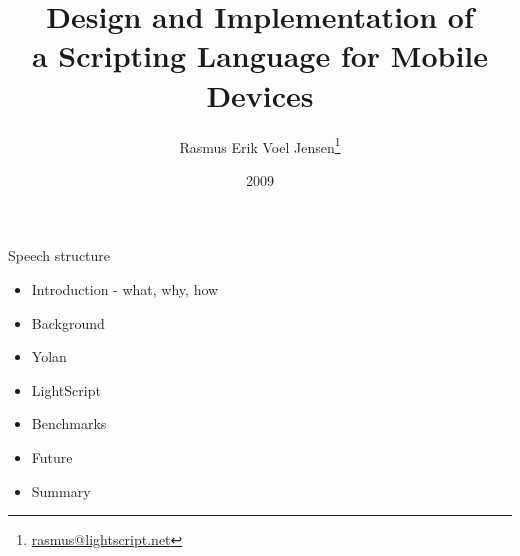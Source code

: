 \documentclass[a4paper,landscape]{slides}
\title{Design and Implementation of \\ a Scripting Language for Mobile Devices }
\author{Rasmus Erik Voel Jensen\footnote{\url{rasmus@lightscript.net}}}
\date{2009}
\begin{document}
\maketitle

\begin{comment}


- Introduction
  - Speech structure
    
  - Goal: better mobile development
    - I want a scripting language for mobile phones with:
      - first class functions
      - loading of scripts at run time
      - runs on as many phones as possible (platform, size, performance_
      - usable by others
    - Problem the landscape of mobile development
    - Why important
  - My solution
    - LightScript
- Body
  - Yolan
    - Goals
  - LightScript
    - Goals
    - EcmaScript...
- Conclusion

\end{comment}

\begin{slide}
	\begin{center} {\large 
            Speech structure
	} \end{center}
	\begin{itemize} \addtolength{\itemsep}{-\baselineskip}
		\item Introduction - what, why, how
		\item Background
		\item Yolan
		\item LightScript
		\item Benchmarks
		\item Future
		\item Summary
	\end{itemize}
\end{slide}
\end{document}
